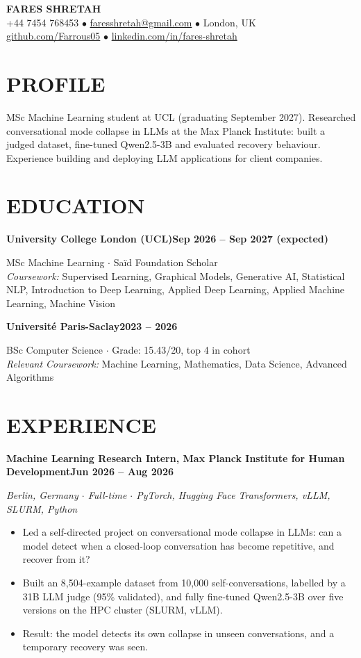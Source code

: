 \documentclass[10pt, a4paper]{article}
\newcommand{\entry}[2]{\vspace{5pt}\textbf{#1}\hfill\textbf{#2}\par}
\newcommand{\sub}[1]{\textit{#1}\par}
\begin{document}
\begin{center}
    {\huge \textbf{FARES SHRETAH}} \\[3pt]
    \small +44 7454 768453 $\bullet$ \href{mailto:faresshretah@gmail.com}{faresshretah@gmail.com} $\bullet$ London, UK \\
    \small \href{https://github.com/Farrous05}{github.com/Farrous05} $\bullet$ \href{https://www.linkedin.com/in/fares-shretah/}{linkedin.com/in/fares-shretah}
\end{center}

\section*{PROFILE}
MSc Machine Learning student at UCL (graduating September 2027). Researched conversational mode collapse in LLMs at the Max Planck Institute: built a judged dataset, fine-tuned Qwen2.5-3B and evaluated recovery behaviour. Experience building and deploying LLM applications for client companies.

\section*{EDUCATION}
\entry{University College London (UCL)}{Sep 2026 -- Sep 2027 (expected)}
MSc Machine Learning $\cdot$ Sa\"id Foundation Scholar \\
\textit{Coursework:} Supervised Learning, Graphical Models, Generative AI, Statistical NLP, Introduction to Deep Learning, Applied Deep Learning, Applied Machine Learning, Machine Vision

\entry{Universit\'e Paris-Saclay}{2023 -- 2026}
BSc Computer Science $\cdot$ Grade: 15.43/20, top 4 in cohort \\
\textit{Relevant Coursework:} Machine Learning, Mathematics, Data Science, Advanced Algorithms

\section*{EXPERIENCE}
\entry{Machine Learning Research Intern, Max Planck Institute for Human Development}{Jun 2026 -- Aug 2026}
\sub{Berlin, Germany $\cdot$ Full-time $\cdot$ PyTorch, Hugging Face Transformers, vLLM, SLURM, Python}
\begin{itemize}
    \item Led a self-directed project on conversational mode collapse in LLMs: can a model detect when a closed-loop conversation has become repetitive, and recover from it?
    \item Built an 8,504-example dataset from 10,000 self-conversations, labelled by a 31B LLM judge (95\% validated), and fully fine-tuned Qwen2.5-3B over five versions on the HPC cluster (SLURM, vLLM).
    \item Result: the model detects its own collapse in unseen conversations, and a temporary recovery was seen.
\end{itemize}
\end{document}
